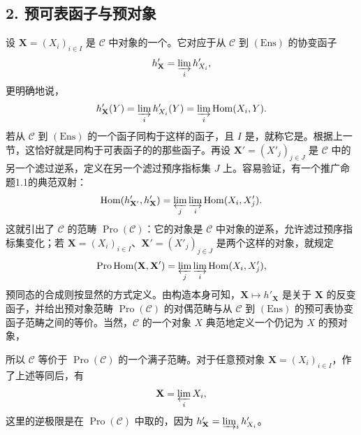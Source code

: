 \subsection*{2. 预可表函子与预对象}
设 $\mathbf X=(X_i)_{i\in I}$ 是 $\mathcal C$ 中对象的一个。它对应于从 $\mathcal C$ 到 $(\mathrm{Ens})$ 的协变函子
\[
 h'_{\mathbf X}=\varinjlim_i h'_{X_i},
\]
更明确地说，
\[
 h'_{\mathbf X}(Y)=\varinjlim_i h'_{X_i}(Y)=\varinjlim_i\operatorname{Hom}(X_i,Y).
\]
若从 $\mathcal C$ 到 $(\mathrm{Ens})$ 的一个函子同构于这样的函子，且 $I$ 是，就称它是。根据上一节，这恰好就是同构于可表函子的的那些函子。再设 $\mathbf X'=(X'_j)_{j\in J}$ 是 $\mathcal C$ 中的另一个滤过逆系，定义在另一个滤过预序指标集 $J$ 上。容易验证，有一个推广命题1.1的典范双射：
\[
 \operatorname{Hom}(h'_{\mathbf X'},h'_{\mathbf X})
 =\varprojlim_j\varinjlim_i\operatorname{Hom}(X_i,X'_j).
\]
这就引出了 $\mathcal C$ 的范畴 $\operatorname{Pro}(\mathcal C)$：它的对象是 $\mathcal C$ 中对象的逆系，允许滤过预序指标集变化；若 $\mathbf X=(X_i)_{i\in I}$、$\mathbf X'=(X'_j)_{j\in J}$ 是两个这样的对象，就规定
\[
 \operatorname{Pro\,Hom}(\mathbf X,\mathbf X')
 =\varprojlim_j\varinjlim_i\operatorname{Hom}(X_i,X'_j),
\]
预同态的合成则按显然的方式定义。由构造本身可知，$\mathbf X\mapsto h'_{\mathbf X}$ 是关于 $\mathbf X$ 的反变函子，并给出预对象范畴 $\operatorname{Pro}(\mathcal C)$ 的对偶范畴与从 $\mathcal C$ 到 $(\mathrm{Ens})$ 的预可表协变函子范畴之间的等价。当然，$\mathcal C$ 的一个对象 $X$ 典范地定义一个仍记为 $X$ 的预对象，

所以 $\mathcal C$ 等价于 $\operatorname{Pro}(\mathcal C)$ 的一个满子范畴。对于任意预对象 $\mathbf X=(X_i)_{i\in I}$，作了上述等同后，有
\[
 \mathbf X=\varprojlim_i X_i,
\]
这里的逆极限是在 $\operatorname{Pro}(\mathcal C)$ 中取的，因为 $h'_{\mathbf X}=\varinjlim_i h'_{X_i}$。

